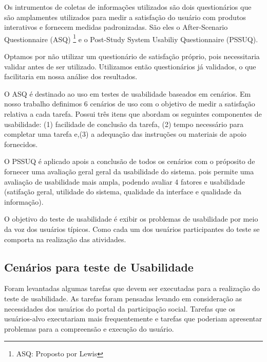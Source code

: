 	Os intrumentos de coletas de informações utilizados são dois questionários que são amplamentes utilizados para medir a satisfação do usuário com produtos interativos e fornecem medidas padronizadas. São eles o After-Scenario Questionnaire (ASQ) \footnote{ASQ: Proposto por Lewis} e o Post-Study System Usabiliy Questionnaire (PSSUQ). 

	Optamos por não utilizar um questionário de satisfação próprio, pois necessitaria validar antes de ser utilizado.  Utilizamos então questionários já validados, o que facilitaria em nossa análise dos resultados.

	O ASQ é destinado ao uso em testes de usabilidade baseados em cenários. Em nosso trabalho definimos 6 cenários de uso com o objetivo de medir a satisfação relativa a cada tarefa. Possui três itens que abordam os seguintes componentes de usabilidade: (1) facilidade de conclusão da tarefa, (2) tempo necessário para completar uma tarefa e,(3) a adequação das instruções ou materiais de apoio fornecidos.

	O PSSUQ é aplicado apois a conclusão de todos os cenários com o próposito de fornecer uma avaliação geral geral da usabilidade do sistema. pois permite uma avaliação de usabilidade mais ampla, podendo avaliar 4 fatores e usabilidade (satifação geral, utilidade do sistema, qualidade da interface e qualidade da informação). 

	O objetivo do teste de usabilidade é exibir os problemas de usabilidade por meio da voz dos usuários típicos. Como cada um dos usuários participantes do teste se comporta na realização das atividades.

\subsection{Cenários para teste de Usabilidade}

	Foram levantadas algumas tarefas que devem ser executadas para a realização do teste de usabilidade. As tarefas foram pensadas levando em consideração as necessidades dos usuários do portal da participação social. Tarefas que os usuários-alvo executariam mais frequentemente e tarefas que poderiam apresentar problemas para a compreensão e execução do usuário. 

